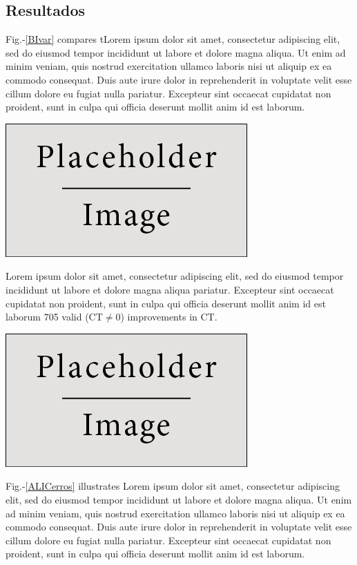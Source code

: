 \documentclass[a0,portrait]{a0poster}
\begin{document}
\begin{minipage}[c]{\linewidth}
\begin{framed}
\begin{multicols}{2}
\section*{Resultados}
Fig.-\ref{BIvar} compares tLorem ipsum dolor sit amet, consectetur adipiscing elit, sed do eiusmod tempor incididunt ut labore et dolore magna aliqua. Ut enim ad minim veniam, quis nostrud exercitation ullamco laboris nisi ut aliquip ex ea commodo consequat. Duis aute irure dolor in reprehenderit in voluptate velit esse cillum dolore eu fugiat nulla pariatur. Excepteur sint occaecat cupidatat non proident, sunt in culpa qui officia deserunt mollit anim id est laborum.
\begin{center}
\includegraphics[width=0.6\linewidth]{figures/placeholder}
\label{BIvar}
\end{center}
Lorem ipsum dolor sit amet, consectetur adipiscing elit, sed do eiusmod tempor incididunt ut labore et dolore magna aliqua pariatur. Excepteur sint occaecat cupidatat non proident, sunt in culpa qui officia deserunt mollit anim id est laborum 705 valid (CT$\neq$0) improvements in CT.
\begin{center}
\includegraphics[width=0.6\linewidth]{figures/placeholder}
\label{ALICerros}
\end{center}
Fig.-\ref{ALICerros} illustrates Lorem ipsum dolor sit amet, consectetur adipiscing elit, sed do eiusmod tempor incididunt ut labore et dolore magna aliqua. Ut enim ad minim veniam, quis nostrud exercitation ullamco laboris nisi ut aliquip ex ea commodo consequat. Duis aute irure dolor in reprehenderit in voluptate velit esse cillum dolore eu fugiat nulla pariatur. Excepteur sint occaecat cupidatat non proident, sunt in culpa qui officia deserunt mollit anim id est laborum.\\

\end{multicols}
\end{framed}
\end{minipage}
\end{document}
